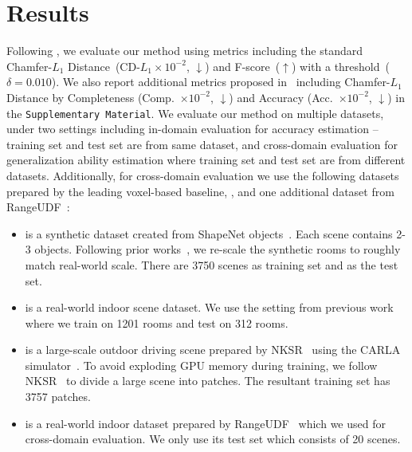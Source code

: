 \section{Results}
\label{sec:results}
Following \nksr, we evaluate our method using metrics including the standard Chamfer-$L_1$ Distance~(CD-$L_1 \times 10^{-2}$, $\downarrow$) and F-score~($\uparrow$) with a threshold~($\delta{=}0.010$). 
We also report additional metrics proposed in \nksr~including Chamfer-$L_1$ Distance by Completeness (Comp.~$\times 10^{-2}$, $\downarrow$) and Accuracy (Acc.~$\times 10^{-2}$, $\downarrow$) in the \texttt{Supplementary Material}. 
We evaluate our method on multiple datasets, under two settings including in-domain evaluation for accuracy estimation -- training set and test set are from same dataset, and cross-domain evaluation for generalization ability estimation where training set and test set are from different datasets. 
Additionally, for cross-domain evaluation we use the following datasets prepared by the leading voxel-based baseline, \nksr, and one additional dataset from RangeUDF~\cite{wang2022rangeudf}:

\begin{itemize}
    \item \synthetic{}  is a synthetic dataset created from ShapeNet objects~\cite{chang2015shapenet}. Each scene contains 2-3 objects. 
    Following prior works~\cite{wang2022rangeudf,chibane2020ndf}, we re-scale the synthetic rooms to roughly match real-world scale.
    There are 3750 scenes as training set and  as the test set. 
    \item \scannet{} is a real-world indoor scene dataset. We use the setting from previous work~\cite{wang2022rangeudf, tang2021SACon, peng2020convoccnet, boulch2022poco} where we train on 1201 rooms and test on 312 rooms. 
    \item \carla is a large-scale outdoor driving scene prepared by NKSR~\cite{huang2023neural} using the CARLA simulator~\cite{dosovitskiy2017carla}. 
    To avoid exploding GPU memory during training, we follow NKSR~\cite{huang2023neural} to divide a large scene into patches. The resultant training set has {3757} patches. 
    \item \scenenn{}  is a real-world indoor dataset prepared by RangeUDF~\cite{wang2022rangeudf} which we used for cross-domain evaluation. We only use its test set which consists of 20 scenes.
\end{itemize}



